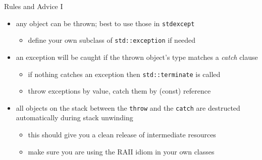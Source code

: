 \begin{frame}[fragile]
  \begin{block}{Rules and Advice I}
    \begin{itemize}
      \item any object can be thrown; best to use those in \texttt{stdexcept}
      \begin{itemize}
        \item define your own subclass of \texttt{std::exception} if needed
      \end{itemize}
      \item an exception will be caught if the thrown object's type matches a \textit{catch} clause
      \begin{itemize}
          \item if nothing catches an exception then \texttt{std::terminate} is called
          \item throw exceptions by value, catch them by (const) reference
      \end{itemize}
      \item all objects on the stack between the \texttt{throw} and the \texttt{catch} are destructed automatically during stack unwinding
      \begin{itemize}
        \item this should give you a clean release of intermediate resources
        \item make sure you are using the RAII idiom in your own classes
      \end{itemize}
    \end{itemize}
  \end{block}
\end{frame}

